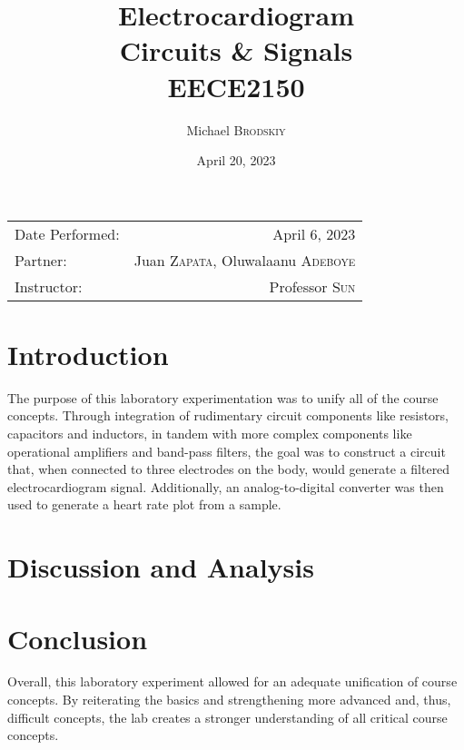 \documentclass[
	letterpaper, %
	10pt, %
]{CSUniSchoolLabReport}
\title{Electrocardiogram\\ Circuits \& Signals \\ EECE2150} %
\author{Michael \textsc{Brodskiy}}
\date{April 20, 2023} %
\begin{document}
\maketitle %

\begin{center}
	\begin{tabular}{l r}
		Date Performed: & April 6, 2023 \\ %
        Partner: & Juan \textsc{Zapata}, Oluwalaanu \textsc{Adeboye} \\ %
		Instructor: & Professor \textsc{Sun} %
	\end{tabular}
\end{center}

\setcounter{section}{-1}

\section{Introduction}

The purpose of this laboratory experimentation was to unify all of the course concepts. Through integration of rudimentary circuit components like resistors, capacitors and inductors, in tandem with more complex components like operational amplifiers and band-pass filters, the goal was to construct a circuit that, when connected to three electrodes on the body, would generate a filtered electrocardiogram signal. Additionally, an analog-to-digital converter was then used to generate a heart rate plot from a sample.

\section{Discussion and Analysis}

\section{Conclusion}

Overall, this laboratory experiment allowed for an adequate unification of course concepts. By reiterating the basics and strengthening more advanced and, thus, difficult concepts, the lab creates a stronger understanding of all critical course concepts.
\end{document}
